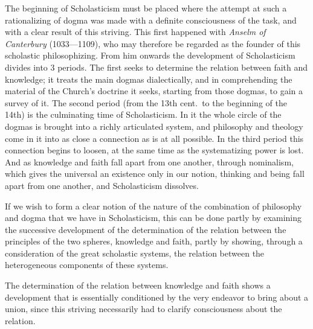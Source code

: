 The beginning of Scholasticism must be placed where the attempt at such a rationalizing of dogma was made with a definite consciousness of the task, and with a clear result of this striving. This first happened with \emph{Anselm of Canterbury} (1033---1109), who may therefore be regarded as the founder of this scholastic philosophizing. From him onwards the development of Scholasticism divides into 3 periods. The first seeks to determine the relation between faith and knowledge; it treats the main dogmas dialectically, and in comprehending the material of the Church's doctrine it seeks, starting from those dogmas, to gain a survey of it. The second period (from the 13th cent.\ to the beginning of the 14th) is the culminating time of Scholasticism. In it the whole circle of the dogmas is brought into a richly articulated system, and philosophy and theology come in it into as close a connection as is at all possible. In the third period this connection begins to loosen, at the same time as the systematizing power is lost. And as knowledge and faith fall apart from one another, through nominalism, which gives the universal an existence only in our notion, thinking and being fall apart from one another, and Scholasticism dissolves.

If we wish to form a clear notion of the nature of the combination of philosophy and dogma that we have in Scholasticism, this can be done partly by examining the successive development of the determination of the relation between the principles of the two spheres, knowledge and faith, partly by showing, through a consideration of the great scholastic systems, the relation between the heterogeneous components of these systems.

The determination of the relation between knowledge and faith shows a development that is essentially conditioned by the very endeavor to bring about a union, since this striving necessarily had to clarify consciousness about the relation.

